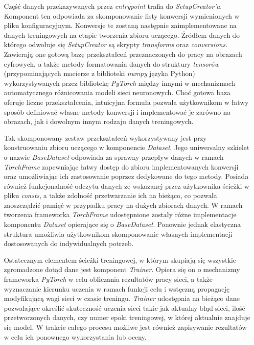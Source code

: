    Część danych przekazywanych przez \textit{entrypoint} trafia do \textit{SetupCreator'a}. Komponent
    ten odpowiada za skomponowanie listy konwersji wymienionych w pliku
    konfiguracyjnym. Konwersje te zostaną następnie zaimplementowane na danych treningowych
    na etapie tworzenia zbioru uczącego. Źródłem danych do którego odwołuje się
    \textit{SetupCreator} są skrypty \textit{transforms} oraz \textit{conversions}. Zawierają one gotową bazę
    przekształceń przeznaczonych do pracy na obrazach cyfrowych, a także metody
    formatowania danych do struktury \textit{tensorów} (przypominających macierze z biblioteki \textit{numpy}
    języka Python) wykorzystywanych przez bibliotekę \textit{PyTorch} między innymi w mechanizmach
    automatycznego różnicowania modeli sieci neuronowych. Choć gotowa baza oferuje
    liczne przekształcenia, intuicyjna formuła pozwala użytkownikom w łatwy sposób definiować
    własne metody konwersji i implementować je zarówno na obrazach, jak i dowolnym innym
    rodzaju danych treningowych.

    Tak skomponowany zestaw przekształceń wykorzystywany jest przy konstruowaniu zbioru
    uczącego w komponencie \textit{Dataset}. Jego uniwersalny szkielet o nazwie \textit{BaseDataset}
    odpowiada za sprawny przepływ danych w ramach \textit{TorchFrame} zapewniając łatwy dostęp
    do zbioru implementowanych konwersji oraz umożliwiając ich zastosowanie poprzez dedykowane
    do tego metody. Posiada również funkcjonalność odczytu danych ze wskazanej przez
    użytkownika ścieżki w pliku \textit{consts}, a także zdolność przetwarzanie ich na bieżąco, co pozwala
    zaoszczędzić pamięć w przypadku pracy na dużych zbiorach danych. W ramach tworzenia
    frameworka \textit{TorchFrame} udostępnione zostały różne implementacje komponentu \textit{Dataset} opierające się o
    \textit{BaseDataset}. Ponownie jednak elastyczna struktura umożliwia użytkownikom
    skomponowanie własnych implementacji dostosowanych do indywidualnych potrzeb.

    Ostatecznym elementem ścieżki treningowej, w którym skupiają się wszystkie
    zgromadzone dotąd dane jest komponent \textit{Trainer}. Opiera się on o mechanizmy
    frameworka \textit{PyTorch} w celu obliczania rezultatów pracy sieci, a także wyznaczanie
    kierunku uczenia w ramach funkcji celu i wstęczną propagację modyfikującą wagi
    sieci w czasie treningu. \textit{Trainer} udostępnia na bieżąco dane pozwalające
    określić skuteczność uczenia sieci takie jak aktualny błąd sieci, ilość
    przetworzonych danych, czy numer epoki treningowej, w której aktualnie znajduje
    się model. W trakcie całego procesu możliwe jest również zapisywanie rezultatów
    w celu ich ponownego wykorzystania lub oceny.

